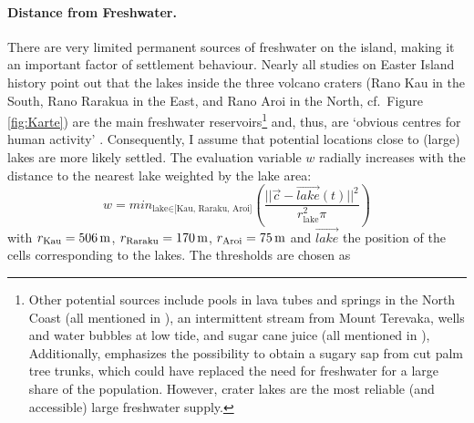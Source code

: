 \paragraph{Distance from Freshwater.}
There are very limited permanent sources of freshwater on the island, making it an important factor of settlement behaviour. 
Nearly all studies on Easter Island history point out that the lakes inside the three volcano craters (Rano Kau in the South, Rano Rarakua in the East, and Rano Aroi in the North, cf.\ Figure \ref{fig:Karte}) are the main freshwater reservoirs\footnote{Other potential sources include pools in lava tubes and springs in the North Coast (all mentioned in ), an intermittent stream from Mount Terevaka, wells and water bubbles at low tide, and sugar cane juice (all mentioned in ), 
Additionally, \citet{Mieth2015} emphasizes the possibility to obtain a sugary sap from cut palm tree trunks, which could have replaced the need for freshwater for a large share of the population.
However, crater lakes are the most reliable (and accessible) large freshwater supply.}
and, thus, are `obvious centres for human activity' \citep{Bahn2017}.
Consequently, I assume that potential locations close to (large) lakes are more likely settled.
The evaluation variable $w$ radially increases with the distance to the nearest lake weighted by the lake area:
\begin{equation}
	w = min_{\text{lake}\in \text{[Kau, Raraku, Aroi]}} \left( \frac{||
		 \vec{c}- \vec{lake}(t)||^2}{r_\text{lake}^2\pi} \right)
\end{equation}
with $r_\text{Kau} = 506\, \rm{m}$, $r_\text{Raraku} = 170\, \rm{m}$, $r_\text{Aroi} = 75\, \rm{m}$ and $\vec{lake}$ the position of the cells corresponding to the lakes.
The thresholds are chosen as 
